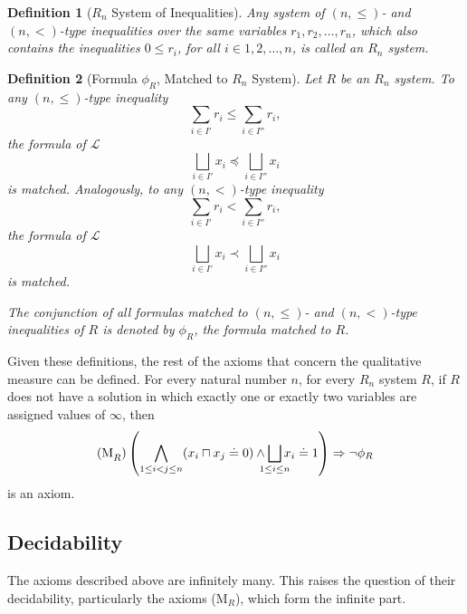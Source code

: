 \documentclass{article}
\newtheorem*{definition}{Definition}
\newcommand{\lang}{\mathcal{L}}
\newcommand{\lcap}{\sqcap}
\newcommand{\lparteq}{\doteq}
\newcommand{\lmeasure}{\preceq}
\newcommand{\lmeasures}{\prec}
\begin{document}
\begin{definition}[$R_n$ System of Inequalities]
  Any system of $(n, \leq)$- and $(n, <)$-type inequalities over the same variables $r_1, r_2, \dots, r_n$, which also contains the inequalities $0 \leq r_i$, for all $i \in {1, 2, \dots, n}$, is called an \emph{$R_n$ system}.
\end{definition}
\begin{definition}[Formula $\phi_R$, Matched to $R_n$ System]
  Let $R$ be an $R_n$ system. To any $(n, \leq)$-type inequality
  \begin{equation*}
    \sum_{i \in I'}r_i \leq \sum_{i \in I''}r_i,
  \end{equation*}
  the formula of $\lang$
  \begin{equation*}
    \bigsqcup_{i \in I'}x_i \lmeasure \bigsqcup_{i \in I''}x_i
  \end{equation*}
  is matched. Analogously, to any $(n, <)$-type inequality
  \begin{equation*}
    \sum_{i \in I'}r_i < \sum_{i \in I''}r_i,
  \end{equation*}
  the formula of $\lang$
  \begin{equation*}
    \bigsqcup_{i \in I'}x_i \lmeasures \bigsqcup_{i \in I''}x_i
  \end{equation*}
  is matched.

  The conjunction of all formulas matched to $(n, \leq)$- and $(n, <)$-type inequalities of $R$ is denoted by $\phi_R$, the formula matched to $R$.
\end{definition}

Given these definitions, the rest of the axioms that concern the qualitative measure can be defined. For every natural number $n$, for every $R_n$ system $R$, if $R$ does not have a solution in which exactly one or exactly two variables are assigned values of $\infty$, then
\[
\text{(M}_R\text{)} \left(\bigwedge_{1 \leq i < j \leq n} (x_i \lcap x_j \lparteq 0) \land \bigsqcup_{\mathclap{1 \leq i \leq n}} x_i \lparteq 1\right) \Rightarrow \lnot \phi_R
\]
is an axiom.
\subsection{Decidability}
The axioms described above are infinitely many. This raises the question of their decidability, particularly the axioms (M$_R$), which form the infinite part.
\end{document}
